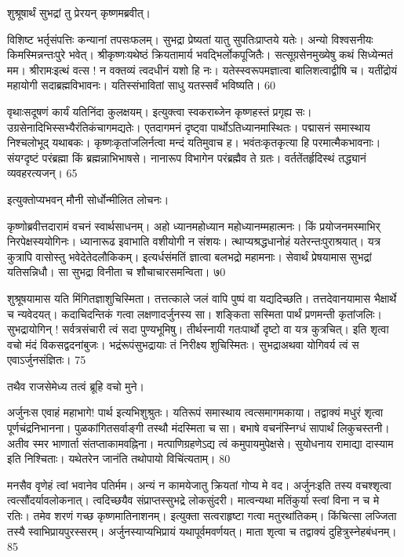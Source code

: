 शुश्रूषार्थं सुभद्रां तु प्रेरयन् कृष्णमब्रवीत्।

विशिष्ट भर्तृसंपत्तिः कन्यानां तपसःफलम्।
सुभद्रा प्रेष्यतां यातु सुपतिःप्राप्तये यतेः।
अन्यो विश्वसनीयः किमस्मिन्नन्तःपुरे भवेत्।
श्रीकृष्णःयथेष्ठं क्रियतामार्य भवद्भिर्लोकपूजितैः।
सत्सूग्रसेनमुख्येषु कथं सिध्येन्मतं मम।
श्रीरामःइत्थं वत्स ! न वक्तव्यं त्वदधीनं यशो हि नः।
यतेस्स्वरूपमज्ञात्वा बालिशत्वाद्वीषि च।
यतींद्रोयं महायोगी सदाब्रह्मविभावनः।
यतिस्संभावितां साधु यतस्सर्वं भविष्यति।
60

वृथाःसदूषणं कार्यं यतिनिंदा कुलक्षयम्।
इत्युक्त्वा स्वकराब्जेन कृष्णहस्तं प्रगृह्य सः।
उग्रसेनादिभिस्सभ्यैरंतिकंचागमद्यतेः।
एतदागमनं दृष्ट्वा पार्थोऽतिध्यानमास्थितः।
पद्मासनं समास्थाय निश्चलोभूद् यथाबकः।
कृष्णःकृतांजलिर्नत्वा मन्दं यतिमुवाच ह।
भवंतःकृतकृत्या हि परमात्मैकभावनाः।
संयग्दृष्टं परंब्रह्मा किं ब्रह्मन्नाभिभाषसे।
नानारूप विभागेन परंब्रह्मैव ते ग्रतः।
वर्ततेंतर्हृदिस्थं तद्ध्यानं व्यवहरत्यजन्।
65

इत्युक्तोप्यभवन् मौनी सोर्धोन्मीलित लोचनः।

कृष्णोब्रवीत्तदारामं वचनं स्वार्थसाधनम्।
अहो ध्यानमहोध्यान महोध्यानम्महात्मनः।
किं प्रयोजनमस्माभिर् निरपेक्षस्ययोगिनः।
ध्यानारूढ इवाभाति वशीयोगी न संशयः।
त्थाप्यश्रद्धधानोहं यतेरन्तःपुराश्रयात्।
यत्र कुत्रापि वासोस्तु भवेदेतेदलौकिकम्।
इत्यर्धसंमतिं ज्ञात्वा बलभद्रो महामनाः।
सेवार्थं प्रेषयामास सुभद्रां यतिसन्निधौ।
सा सुभद्रा विनीता च शौचाचारसमन्विता।
७0

शुश्रूषयामास यति मिंगितज्ञाशुचिस्मिता।
तत्तत्काले जलं वापि पुष्पं वा यद्यदिच्छति।
तत्तदेवानयामास भैक्षार्थे च न्यवेदयत्।
कदाचिदन्तिकं गत्वा लक्षणादर्जुनस्य सा।
शङ्किता सस्मिता पार्थं प्रणमन्ती कृतांजलिः।
सुभद्रायोगिन् ! सर्वत्रसंचारी त्वं सदा पुण्यभूमिषु।
तीर्थस्नायी गतःपार्थो दृष्टो वा यत्र कुत्रचित्।
इति शृत्वा वचो मंदं विकसद्वदनांबुजः।
भद्रंरूपंसुभद्रायाः तं निरीक्ष्य शुचिस्मितः।
सुभद्राअथवा योगिवर्य त्वं स एवाऽर्जुनसंज्ञितः।
75

तथैव राजसेमेध्य तत्वं ब्रूहि वचो मुने।

अर्जुनःस एवाहं महाभागे! पार्थ इत्यभिशुश्रुतः।
यतिरूपं समास्थाय त्वत्समागमकाया।
तद्वाक्यं मधुरं शृत्वा पूर्णचंद्रनिभानना।
पुळकांगितसर्वाङ्गी तस्थौ मंदस्मिता च सा।
बभाषे वचनंस्निग्धं सापार्थं लिकुचस्तनी।
अतीव स्मर भाणार्ता संतप्ताकामवह्निना।
मत्पाणिग्रहणेऽद्य त्वं कमुपायमुपेक्षसे।
सुयोधनाय रामाद्या दास्याम इति निश्चिताः।
यथेतरेन जानंति तथोपायो विचिंत्यताम्।
80

मनसैव वृणेहं त्वां भवानेव पतिर्मम।
अन्यं न कामयेजातु क्रियतां गोप्य मे वद।
अर्जुनःइति तस्य वचश्शृत्वा त्वत्सौंदर्यावलोकनात्।
त्वदिच्छयैव संप्राप्तस्सुभद्रे लोकसुंदरी।
मात्वन्यथा मतिंकुर्या स्त्वां विना न च मे रतिः।
तमेव शरणं गच्छ कृष्णमातिनाशनम्।
इत्युक्ता सत्वराहृष्टा गत्वा मतुरथांतिकम्।
किंचित्सा लज्जिता तस्यै स्वाभिप्रायपुरस्सरम्।
अर्जुनस्याप्यभिप्रायं यथापूर्वमवर्णयत्।
माता शृत्वा च तद्वाक्यं दुहित्रुस्नेहबंधनम्।
85

